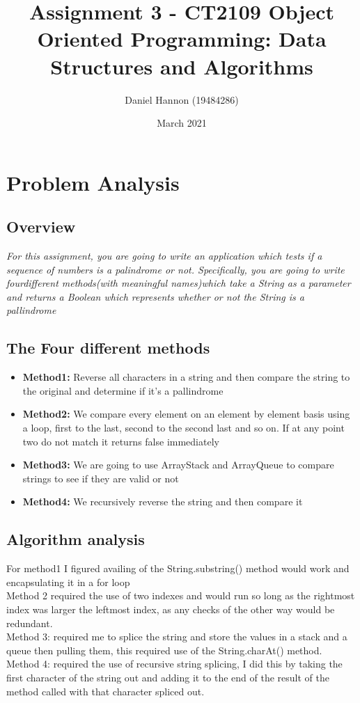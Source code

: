 \documentclass{article}
\title{Assignment 3 - CT2109 Object Oriented Programming: Data Structures and Algorithms}
\author{Daniel Hannon (19484286)}
\date{March 2021}
\begin{document}
	\maketitle
	\section{Problem Analysis}
	\subsection{Overview}
	\textit{For this assignment, you are going to write an application which tests if a sequence of numbers is a palindrome or not. Specifically, you are going to write fourdifferent methods(with meaningful names)which take a String as a parameter and returns a Boolean which represents whether or not the String is a pallindrome}

	\subsection{The Four different methods}
	\begin{itemize}
		\item \textbf{Method1:} Reverse all characters in a string and then compare the string to the original and determine if it's a pallindrome
		\item \textbf{Method2:} We compare every element on an element by element basis using a loop, first to the last, second to the second last and so on. If at any point two do not match it returns false immediately
		\item \textbf{Method3:} We are going to use ArrayStack and ArrayQueue to compare strings to see if they are valid or not
		\item \textbf{Method4:} We recursively reverse the string and then compare it
	\end{itemize}

	\subsection{Algorithm analysis}
	For method1 I figured availing of the String.substring() method would work and encapsulating it in a for loop\\
	Method 2 required the use of two indexes and would run so long as the rightmost index was larger the leftmost index, as any checks of the other way would be redundant.\\
	Method 3: required me to splice the string and store the values in a stack and a queue then pulling them, this required use of the String.charAt() method.\\
	Method 4: required the use of recursive string splicing, I did this by taking the first character of the string out and adding it to the end of the result of the method called with that character spliced out.\\
\end{document}

